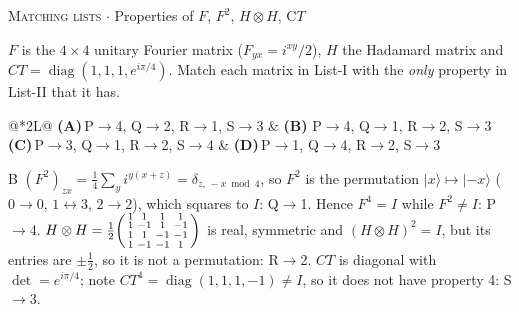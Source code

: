 \documentclass[11pt,a4paper]{article}
\newcommand{\optlabel}[1]{\textbf{(#1)}}
\newcommand{\correctlabel}[1]{\textcolor{okgreen}{\textbf{(#1)}\,\ding{51}}}
\newenvironment{qitem}[1]{\begin{list}{}{\setlength{\leftmargin}{3.3em}\setlength{\labelwidth}{3.1em}%
  \setlength{\labelsep}{0.2em}\setlength{\topsep}{3pt}\setlength{\parsep}{3pt}}\item[\textbf{Q.#1}\hfill]}{\end{list}}
\newcommand{\qsep}{\par\vspace{2pt}{\color{black!15}\hrule}\vspace{4pt}}
\newcommand{\qmeta}[2]{{\footnotesize\color{black!60}\textsc{#1} \;$\cdot$\; #2}\par}
\begin{document}
\begin{qitem}{16}
\qmeta{Matching lists}{Properties of $F$, $F^2$, $H\otimes H$, C$T$}
$F$ is the $4\times4$ unitary Fourier matrix ($F_{yx} = i^{xy}/2$), $H$ the Hadamard matrix and
$CT = \operatorname{diag}(1, 1, 1, e^{i\pi/4})$. Match each matrix in List-I with the \emph{only} property in List-II that it has.
\par\smallskip{}
\par\smallskip\noindent\begin{tabularx}{\linewidth}{@{}*{2}{L}@{}}
\optlabel{A}\,P$\to$4, Q$\to$2, R$\to$1, S$\to$3 & \correctlabel{B}\,P$\to$4, Q$\to$1, R$\to$2, S$\to$3 \\[3pt]
\optlabel{C}\,P$\to$3, Q$\to$1, R$\to$2, S$\to$4 & \optlabel{D}\,P$\to$1, Q$\to$4, R$\to$2, S$\to$3
\end{tabularx}
\end{qitem}
\begin{solbox}{B}
$(F^2)_{zx} = \frac14\sum_y i^{y(x+z)} = \delta_{z,\,-x \bmod 4}$, so $F^2$ is the permutation $|x\rangle \mapsto |{-x}\rangle$
($0\to0$, $1\leftrightarrow3$, $2\to2$), which squares to $I$: Q$\to$1. Hence $F^4 = I$ while $F^2 \neq I$: P$\to$4.
$H\otimes H = \frac12\begin{psmallmatrix}1&1&1&1\\1&-1&1&-1\\1&1&-1&-1\\1&-1&-1&1\end{psmallmatrix}$ is real, symmetric and
$(H\otimes H)^2 = I$, but its entries are $\pm\frac12$, so it is not a permutation: R$\to$2.
$CT$ is diagonal with $\det = e^{i\pi/4}$; note $CT^4 = \operatorname{diag}(1,1,1,-1) \neq I$, so it does not have property 4: S$\to$3.
\end{solbox}
\qsep
\end{document}
